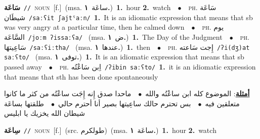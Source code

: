 \documentclass[10pt,a4paper,twoside]{article} %
\begin{document}
\begin{multicols}{2}
{\setlength\topsep{0pt}\textbf{\foreignlanguage{arabic}{سَاعَة}}\ {\color{gray}\texttt{//}\color{black}}\ \textsc{noun}\ [f.]\ \color{gray}(msa. \foreignlanguage{arabic}{ساعَة}~\foreignlanguage{arabic}{\textbf{١.}})\color{black}\ \textbf{1.}~hour  \textbf{2.}~watch\ \ $\bullet$\ \ \textsc{ph.} \color{gray} \foreignlanguage{arabic}{سَاعَة شيطَان}\color{black}\ {\color{gray}\texttt{/{\sffamily saːʕit ʃajtˤaːn}/}\color{black}}\ \textbf{1.}~It is an idiomatic expression that means that sb was very angry at a particular time, then he calmed down\ \ $\bullet$\ \ \textsc{ph.} \color{gray} \foreignlanguage{arabic}{يوم السَّاعَة}\color{black}\ {\color{gray}\texttt{/{\sffamily joːm ʔissaːʕa}/}\color{black}}\ \color{gray} (msa. \foreignlanguage{arabic}{ض}~\foreignlanguage{arabic}{\textbf{١.}})\color{black}\ \textbf{1.}~The Day of the Judgment\ \ $\bullet$\ \ \textsc{ph.} \color{gray} \foreignlanguage{arabic}{سَاعِيتهَا}\color{black}\ {\color{gray}\texttt{/{\sffamily saːʕiːtha}/}\color{black}}\ \color{gray} (msa. \foreignlanguage{arabic}{عندها}~\foreignlanguage{arabic}{\textbf{١.}})\color{black}\ \textbf{1.}~then\ \ $\bullet$\ \ \textsc{ph.} \color{gray} \foreignlanguage{arabic}{إِجت سَاعته}\color{black}\ {\color{gray}\texttt{/{\sffamily ʔi(dʒ)at saːʕto}/}\color{black}}\ \color{gray} (msa. \foreignlanguage{arabic}{توفى}~\foreignlanguage{arabic}{\textbf{١.}})\color{black}\ \textbf{1.}~It is an idiomatic expression that means that sb passed away\ \ $\bullet$\ \ \textsc{ph.} \color{gray} \foreignlanguage{arabic}{اِبن سَاعْتُه}\color{black}\ {\color{gray}\texttt{/{\sffamily ʔibin saːʕto}/}\color{black}}\ \textbf{1.}~it is an idiomatic expression that means that sth has been done spontaneously\  \begin{flushright}\color{gray}\foreignlanguage{arabic}{\textbf{\underline{\foreignlanguage{arabic}{أمثلة}}}: الموضوع كله ابن ساعْتُه والله\ $\bullet$\ \  ماحدا صدق إِنه إِجَت ساعْتُه من كثر ما كانوا متعلقين فيه\ $\bullet$\ \  بس تحترم حالك ساعِيتها بصير أنا أحترم حالي\ $\bullet$\ \  طلقتها بساعَة شيطان الله يخزيك يا ابليس}\end{flushright}\color{black}} \vspace{2mm}

{\setlength\topsep{0pt}\textbf{\foreignlanguage{arabic}{سِاعَة}}\ {\color{gray}\texttt{//}\color{black}}\ \textsc{noun}\ [f.]\ (src. \color{gray}\foreignlanguage{arabic}{طولكرم}\color{black})\ \color{gray}(msa. \foreignlanguage{arabic}{ساعَة}~\foreignlanguage{arabic}{\textbf{١.}})\color{black}\ \textbf{1.}~hour  \textbf{2.}~watch\ } \vspace{2mm}


\end{multicols}
\end{document}
